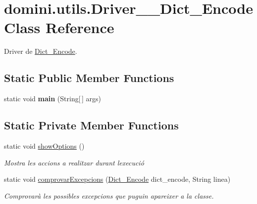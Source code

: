 \hypertarget{classdomini_1_1utils_1_1Driver____Dict__Encode}{}\section{domini.\+utils.\+Driver\+\_\+\+\_\+\+Dict\+\_\+\+Encode Class Reference}
\label{classdomini_1_1utils_1_1Driver____Dict__Encode}


Driver de \hyperlink{classdomini_1_1utils_1_1Dict__Encode}{Dict\+\_\+\+Encode}.  


\subsection*{Static Public Member Functions}
\begin{DoxyCompactItemize}
\item 
\mbox{\label{classdomini_1_1utils_1_1Driver____Dict__Encode_a67a9ab54d3335c433791b823d192ac8f}} 
static void {\bfseries main} (String\mbox{[}$\,$\mbox{]} args)
\end{DoxyCompactItemize}
\subsection*{Static Private Member Functions}
\begin{DoxyCompactItemize}
\item 
\mbox{\label{classdomini_1_1utils_1_1Driver____Dict__Encode_a8b24c280193457c6620b2b5906018c34}} 
static void \hyperlink{classdomini_1_1utils_1_1Driver____Dict__Encode_a8b24c280193457c6620b2b5906018c34}{show\+Options} ()
\begin{DoxyCompactList}\small\item\em Mostra les accions a realitzar durant l\textquotesingle{}execució \end{DoxyCompactList}\item 
static void \hyperlink{classdomini_1_1utils_1_1Driver____Dict__Encode_ab67e87f26a75c12e50130a5e5facb52e}{comprovar\+Excepcions} (\hyperlink{classdomini_1_1utils_1_1Dict__Encode}{Dict\+\_\+\+Encode} dict\+\_\+encode, String linea)
\begin{DoxyCompactList}\small\item\em Comprovarà les possibles excepcions que puguin apareixer a la classe. \end{DoxyCompactList}\end{DoxyCompactItemize}


